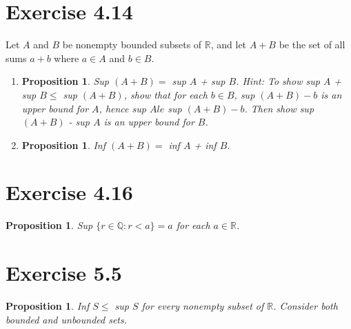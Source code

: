 \documentclass{article}
\newtheorem{proposition}[thm]{Proposition}
\begin{document}
\section*{Exercise 4.14}
Let $A$ and $B$ be nonempty bounded subsets of $\mathbb{R}$, and let $A + B$ be the set of all 
sums $a+b$ where $a\in A$ and $b\in B$.
\begin{enumerate}[label=(\alph*)]
    \item \begin{proposition}
        Sup $(A+B) = $ sup $A$ + sup $B$. Hint: To show sup $A$ + sup $B\le$ sup $(A+B)$, show that 
        for each $b \in B$, sup $(A+B)-b$ is an upper bound for $A$, hence sup $A le$ sup 
        $(A + B) - b$. Then show sup $(A + B)$ - sup $A$ is an upper bound for $B$.
    \end{proposition}
    \item \begin{proposition}
        Inf $(A+B) = $ inf $A$ + inf $B$.
    \end{proposition}
\end{enumerate}

\section*{Exercise 4.16}
\begin{proposition}
    Sup $\{r\in\mathbb{Q}:r<a\} = a$ for each $a\in\mathbb{R}$.
\end{proposition}

\section*{Exercise 5.5}
\begin{proposition}
    Inf $S \le$ sup $S$ for every nonempty subset of $\mathbb{R}$. Consider both bounded and 
    unbounded sets.
\end{proposition}
\end{document}

